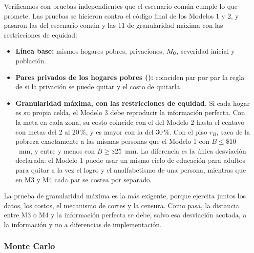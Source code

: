 Verificamos con pruebas independientes que el escenario común cumple lo que
promete. Las pruebas se hicieron contra el código final de los Modelos 1 y 2, y
pasaron las \cValidOK{} del escenario común y las 11 de granularidad máxima con las
restricciones de equidad:
\begin{itemize}
\item \textbf{Línea base:} mismos hogares pobres, privaciones, $M_0$, severidad
  inicial y población.
\item \textbf{Pares privados de los hogares pobres (\cParesPobres{}):} coinciden
  par por par la regla de si la privación se puede quitar y el costo de quitarla.
\item \textbf{Granularidad máxima, con las restricciones de equidad.} Si cada
  hogar es su propia celda, el Modelo 3 debe reproducir la información perfecta.
  Con la meta en cada zona, su costo coincide con el del Modelo 2 hasta el
  centavo con metas del 2 al 20\,\%, y es \cGunoTreinta{} mayor con la del
  30\,\%. Con el piso $r_B$, saca de la pobreza exactamente a las mismas personas
  que el Modelo 1 con $B\le\$10$~mm, y entre \cGdosMin{} y \cGdosMax{} menos con
  $B\ge\$25$~mm. La diferencia es la única desviación declarada: el Modelo 1 puede usar un mismo ciclo de educación para
  adultos para quitar a la vez el logro y el analfabetismo de una persona,
  mientras que en M3 y M4 cada par se costea por separado.
\end{itemize}
La prueba de granularidad máxima es la más exigente, porque ejercita juntos los
datos, los costos, el mecanismo de cortes y la censura. Como pasa, la distancia
entre M3 o M4 y la información perfecta se debe, salvo esa desviación acotada, a
la información y no a diferencias de implementación.

\subsubsection{Monte Carlo}

